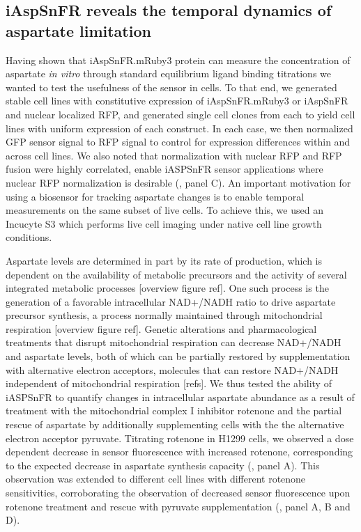 \documentclass[9pt,lineno]{elife}
\begin{document}
\subsection{iAspSnFR reveals the temporal dynamics of aspartate limitation}
Having shown that iAspSnFR.mRuby3 protein can measure the concentration of aspartate \textit{in vitro} through standard equilibrium ligand binding titrations we wanted to test the usefulness of the sensor in cells.
To that end, we generated stable cell lines with constitutive expression of iAspSnFR.mRuby3 or iAspSnFR and nuclear localized RFP, and generated single cell clones from each to yield cell lines with uniform expression of each construct.
In each case, we then normalized GFP sensor signal to RFP signal to control for expression differences within and across cell lines.
We also noted that normalization with nuclear RFP and RFP fusion were highly correlated, enable iASPSnFR sensor applications where nuclear RFP normalization is desirable (, panel C).
An important motivation for using a biosensor for tracking aspartate changes is to enable temporal measurements on the same subset of live cells.
To achieve this, we used an Incucyte S3 which performs live cell imaging under native cell line growth conditions.

Aspartate levels are determined in part by its rate of production, which is dependent on the availability of metabolic precursors and the activity of several integrated metabolic processes [overview figure ref].
One such process is the generation of a favorable intracellular NAD+/NADH ratio to drive aspartate precursor synthesis, a process normally maintained through mitochondrial respiration [overview figure ref].
Genetic alterations and pharmacological treatments that disrupt mitochondrial respiration can decrease NAD+/NADH and aspartate levels, both of which can be partially restored by supplementation with alternative electron acceptors, molecules that can restore NAD+/NADH independent of mitochondrial respiration  [refs].
We thus tested the ability of iASPSnFR to quantify changes in intracellular aspartate abundance as a result of treatment with the mitochondrial complex I inhibitor rotenone and the partial rescue of aspartate by additionally supplementing cells with the the alternative electron acceptor pyruvate.
Titrating rotenone in H1299 cells, we observed a dose dependent decrease in sensor fluorescence with increased rotenone, corresponding to the expected decrease in aspartate synthesis capacity (, panel A).
This observation was extended to different cell lines with different rotenone sensitivities, corroborating the observation of decreased sensor fluorescence upon rotenone treatment and rescue with pyruvate supplementation (, panel A, B and D).
\end{document}
